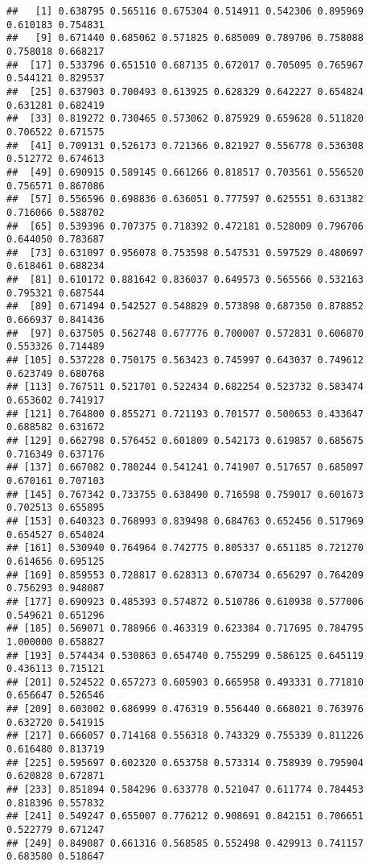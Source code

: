 \documentclass[
]{article}
\begin{document}
\begin{verbatim}
##   [1] 0.638795 0.565116 0.675304 0.514911 0.542306 0.895969 0.610183 0.754831
##   [9] 0.671440 0.685062 0.571825 0.685009 0.789706 0.758088 0.758018 0.668217
##  [17] 0.533796 0.651510 0.687135 0.672017 0.705095 0.765967 0.544121 0.829537
##  [25] 0.637903 0.700493 0.613925 0.628329 0.642227 0.654824 0.631281 0.682419
##  [33] 0.819272 0.730465 0.573062 0.875929 0.659628 0.511820 0.706522 0.671575
##  [41] 0.709131 0.526173 0.721366 0.821927 0.556778 0.536308 0.512772 0.674613
##  [49] 0.690915 0.589145 0.661266 0.818517 0.703561 0.556520 0.756571 0.867086
##  [57] 0.556596 0.698836 0.636051 0.777597 0.625551 0.631382 0.716066 0.588702
##  [65] 0.539396 0.707375 0.718392 0.472181 0.528009 0.796706 0.644050 0.783687
##  [73] 0.631097 0.956078 0.753598 0.547531 0.597529 0.480697 0.618461 0.688234
##  [81] 0.610172 0.881642 0.836037 0.649573 0.565566 0.532163 0.795321 0.687544
##  [89] 0.671494 0.542527 0.548829 0.573898 0.687350 0.878852 0.666937 0.841436
##  [97] 0.637505 0.562748 0.677776 0.700007 0.572831 0.606870 0.553326 0.714489
## [105] 0.537228 0.750175 0.563423 0.745997 0.643037 0.749612 0.623749 0.680768
## [113] 0.767511 0.521701 0.522434 0.682254 0.523732 0.583474 0.653602 0.741917
## [121] 0.764800 0.855271 0.721193 0.701577 0.500653 0.433647 0.688582 0.631672
## [129] 0.662798 0.576452 0.601809 0.542173 0.619857 0.685675 0.716349 0.637176
## [137] 0.667082 0.780244 0.541241 0.741907 0.517657 0.685097 0.670161 0.707103
## [145] 0.767342 0.733755 0.638490 0.716598 0.759017 0.601673 0.702513 0.655895
## [153] 0.640323 0.768993 0.839498 0.684763 0.652456 0.517969 0.654527 0.654024
## [161] 0.530940 0.764964 0.742775 0.805337 0.651185 0.721270 0.614656 0.695125
## [169] 0.859553 0.728817 0.628313 0.670734 0.656297 0.764209 0.756293 0.948087
## [177] 0.690923 0.485393 0.574872 0.510786 0.610938 0.577006 0.549621 0.651296
## [185] 0.569071 0.788966 0.463319 0.623384 0.717695 0.784795 1.000000 0.658827
## [193] 0.574434 0.530863 0.654740 0.755299 0.586125 0.645119 0.436113 0.715121
## [201] 0.524522 0.657273 0.605903 0.665958 0.493331 0.771810 0.656647 0.526546
## [209] 0.603002 0.686999 0.476319 0.556440 0.668021 0.763976 0.632720 0.541915
## [217] 0.666057 0.714168 0.556318 0.743329 0.755339 0.811226 0.616480 0.813719
## [225] 0.595697 0.602320 0.653758 0.573314 0.758939 0.795904 0.620828 0.672871
## [233] 0.851894 0.584296 0.633778 0.521047 0.611774 0.784453 0.818396 0.557832
## [241] 0.549247 0.655007 0.776212 0.908691 0.842151 0.706651 0.522779 0.671247
## [249] 0.849087 0.661316 0.568585 0.552498 0.429913 0.741157 0.683580 0.518647

\end{verbatim}
\end{document}
